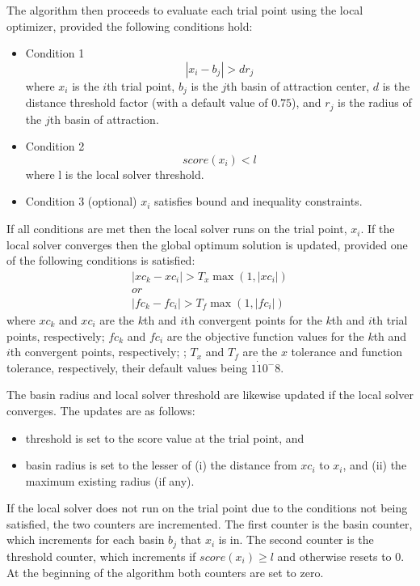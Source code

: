 The algorithm then proceeds to evaluate each trial point using the local optimizer, provided the following conditions hold:


\begin{itemize}
\item Condition 1
    \begin{equation}
        \label{eq:condition1}
        | x_i - b_j | > dr_j
    \end{equation}
        where $x_i$ is the $i$th trial point, $b_j$ is the $j$th basin of attraction center, $d$ is the distance threshold factor (with a default value of $0.75$), and $r_j$ is the radius of the $j$th basin of attraction. 
    \item Condition 2 \[ score(x_i) < l\] where l is the local solver threshold.
    \item Condition 3 (optional) $x_i$ satisfies bound and inequality constraints.
\end{itemize}
If all conditions are met then the local solver runs on the trial point, $x_i$. If the local solver converges then the global optimum solution is updated, provided one of the following conditions is satisfied:
\begin{align}
    \label{eq:updateglobal}
    |xc_k - xc_i | > T_x \max ( 1,|xc_i| ) \nonumber \\ 
    or \\
    |fc_k - fc_i | > T_f \max ( 1,|fc_i| )  \nonumber
\end{align}
where $xc_k$ and $xc_i$ are the $k$th and $i$th convergent points for the $k$th and $i$th trial points, respectively; $fc_k$ and $fc_i$ are the objective function values for the $k$th and $i$th convergent points, respectively; ; $T_x$ and $T_f$ are the $x$ tolerance and function tolerance, respectively, their default values being $1\dot 10^-8$. 

The basin radius and local solver threshold are likewise updated if the local solver converges. The updates are as follows:
\begin{itemize}
    \item threshold is set to the score value at the trial point, and
    \item basin radius is set to the lesser of (i) the distance from $xc_i$ to $x_i$, and (ii) the maximum existing radius (if any).
\end{itemize}

If the local solver does not run on the trial point due to the conditions not being satisfied, the two counters are incremented. The first counter is the basin counter, which increments for each basin $b_j$ that $x_i$ is in. The second counter is the threshold counter, which increments if $score(x_i) \geq l$ and otherwise resets to 0. At the beginning of the algorithm both counters are set to zero. 

